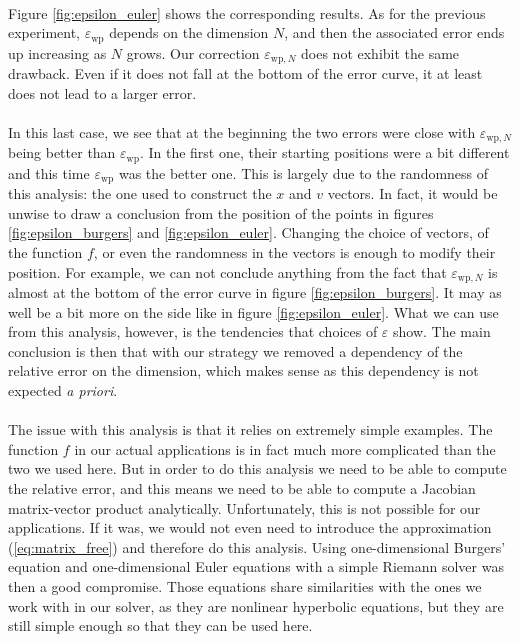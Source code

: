       \paragraph{}
      Figure \ref{fig:epsilon_euler} shows the corresponding results.
      As for the previous experiment, $\varepsilon_\textrm{wp}$ depends on the dimension $N$, and then the associated error ends up increasing as $N$ grows.
      Our correction $\varepsilon_{\textrm{wp}, N}$ does not exhibit the same drawback.
      Even if it does not fall at the bottom of the error curve, it at least does not lead to a larger error.

      \paragraph{}
      In this last case, we see that at the beginning the two errors were close with $\varepsilon_{\textrm{wp}, N}$ being better than $\varepsilon_\textrm{wp}$.
      In the first one, their starting positions were a bit different and this time $\varepsilon_\textrm{wp}$ was the better one.
      This is largely due to the randomness of this analysis: the one used to construct the $x$ and $v$ vectors.
      In fact, it would be unwise to draw a conclusion from the position of the points in figures \ref{fig:epsilon_burgers} and \ref{fig:epsilon_euler}.
      Changing the choice of vectors, of the function $f$, or even the randomness in the vectors is enough to modify their position.
      For example, we can not conclude anything from the fact that $\varepsilon_{\textrm{wp}, N}$ is almost at the bottom of the error curve in figure \ref{fig:epsilon_burgers}.
      It may as well be a bit more on the side like in figure \ref{fig:epsilon_euler}.
      What we can use from this analysis, however, is the tendencies that choices of $\varepsilon$ show.
      The main conclusion is then that with our strategy we removed a dependency of the relative error on the dimension, which makes sense as this dependency is not expected {\it a priori}.

      \paragraph{}
      The issue with this analysis is that it relies on extremely simple examples.
      The function $f$ in our actual applications is in fact much more complicated than the two we used here.
      But in order to do this analysis we need to be able to compute the relative error, and this means we need to be able to compute a Jacobian matrix-vector product analytically.
      Unfortunately, this is not possible for our applications.
      If it was, we would not even need to introduce the approximation (\ref{eq:matrix_free}) and therefore do this analysis.
      Using one-dimensional Burgers' equation and one-dimensional Euler equations with a simple Riemann solver was then a good compromise.
      Those equations share similarities with the ones we work with in our solver, as they are nonlinear hyperbolic equations, but they are still simple enough so that they can be used here.



